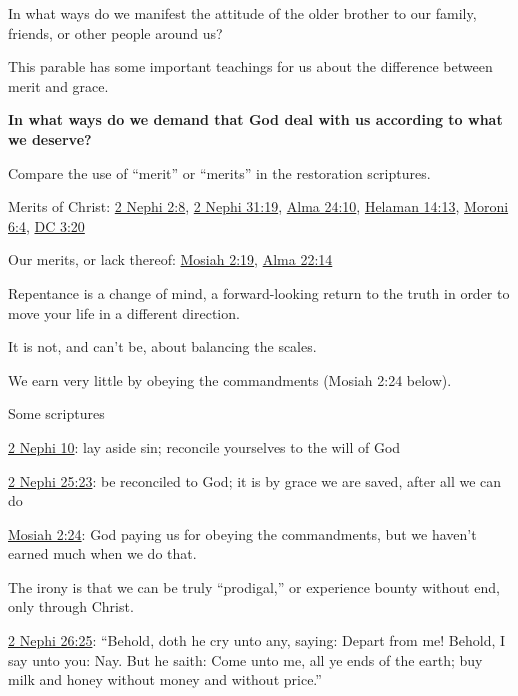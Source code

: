 \begin{compactitem}
			\item In what ways do we manifest the attitude of the older brother to our family, friends, or other people around us?
			
			\item This parable has some important teachings for us about the difference between merit and grace.
				\begin{compactitem}
					\item \textbf{In what ways do we demand that God deal with us according to what we deserve?}
					\item Compare the use of ``merit'' or ``merits'' in the restoration scriptures.
						\begin{compactitem}
							\item Merits of Christ: \hyperref[2NEPHI-2-8]{2 Nephi 2:8}, \hyperref[2NEPHI-31-19]{2 Nephi 31:19}, \hyperref[ALMA-24-10]{Alma 24:10}, \hyperref[HELAMAN-14-13]{Helaman 14:13}, \hyperref[MORONI-6-4]{Moroni 6:4}, \hyperref[DC3-20]{DC 3:20}
							\item Our merits, or lack thereof: \hyperref[MOSIAH-2-19]{Mosiah 2:19}, \hyperref[ALMA-22-14]{Alma 22:14}
						\end{compactitem}
					\item Repentance is a change of mind, a forward-looking return to the truth in order to move your life in a different direction.
						\begin{compactitem}
							\item It is not, and can't be, about balancing the scales.
							\item We earn very little by obeying the commandments (Mosiah 2:24 below).
						\end{compactitem}
					\item Some scriptures
						\begin{compactitem}
							\item \hyperref[2NEPHI-10]{2 Nephi 10}: lay aside sin; reconcile yourselves to the will of God
							\item \hyperref[2NEPHI-25-23]{2 Nephi 25:23}: be reconciled to God; it is by grace we are saved, after all we can do
							\item \hyperref[MOSIAH-2-24]{Mosiah 2:24}: God paying us for obeying the commandments, but we haven't earned much when we do that.
						\end{compactitem}
				\end{compactitem}
				
			\item The irony is that we can be truly ``prodigal,'' or experience bounty without end, only through Christ.
				\begin{compactitem}
					\item \hyperref[2NEPHI-26-25]{2 Nephi 26:25}: ``Behold, doth he cry unto any, saying: Depart from me! Behold, I say unto you: Nay. But he saith: Come unto me, all ye ends of the earth; buy milk and honey without money and without price.''
				\end{compactitem}
		
		\end{compactitem}
	

